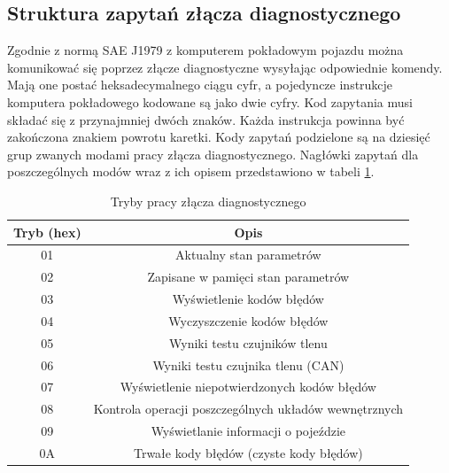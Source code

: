 \documentclass[12pt]{article} %
\numberwithin{equation}{subsection}
\numberwithin{figure}{section}
\numberwithin{table}{section}
\begin{document}
		\newpage
		
		\subsection{Struktura zapytań złącza diagnostycznego}
		
		\hspace{0.5cm}Zgodnie z normą SAE J1979 z komputerem pokładowym pojazdu można komunikować się poprzez złącze diagnostyczne wysyłając odpowiednie komendy. Mają one postać heksadecymalnego ciągu cyfr, a pojedyncze instrukcje komputera pokładowego kodowane są jako dwie cyfry. Kod zapytania musi składać się z przynajmniej dwóch znaków. Każda instrukcja powinna być zakończona znakiem powrotu karetki. Kody zapytań podzielone są na dziesięć grup zwanych modami pracy złącza diagnostycznego. Nagłówki zapytań dla poszczególnych modów wraz z ich opisem przedstawiono w tabeli \ref{tab_pid_modes}.
		
		\begin{table}[ht]
\centering
\caption{Tryby pracy złącza diagnostycznego}
\label{tab_pid_modes}
\begin{tabular}{|c|c|}
\hline
\textbf{Tryb (hex)} & \textbf{Opis}                                                               \\ \hline
01                  & Aktualny stan parametrów                              \\ \hline
02                  & Zapisane w pamięci stan parametrów                      \\ \hline
03                  & Wyświetlenie kodów błędów                                                        \\ \hline
04                  & Wyczyszczenie kodów błędów            \\ \hline
05                  & Wyniki testu czujników tlenu \\ \hline
06                  & Wyniki testu czujnika tlenu (CAN)                             \\ \hline
07                  & Wyświetlenie niepotwierdzonych kodów błędów         \\ \hline
08                  & Kontrola operacji poszczególnych układów wewnętrznych                       \\ \hline
09                  & Wyświetlanie informacji o pojeździe                                                           \\ \hline
0A                  & Trwałe kody błędów (czyste kody błędów)                                     \\ \hline
\end{tabular}
\end{table}
\end{document}

